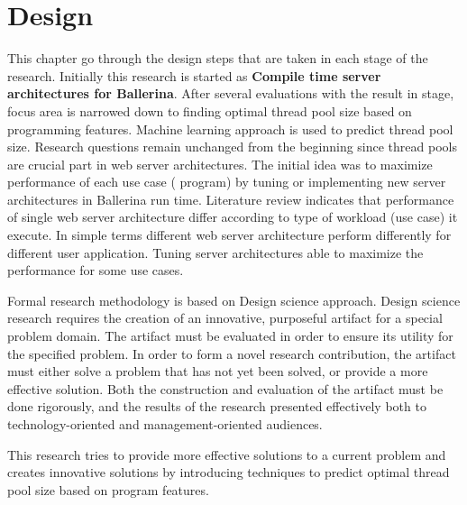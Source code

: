 \chapter{Design}


This chapter go through the design steps that are taken in each stage of the research. Initially this research is started as\textbf{ Compile time server architectures for Ballerina}. After several evaluations with the result in stage, focus area is narrowed down to finding optimal thread pool size based on programming features. Machine learning approach is used to predict thread pool size. Research questions remain unchanged from the beginning since thread pools are crucial part in web server architectures. The initial idea was to maximize performance of each use case ( program) by tuning or implementing new server architectures in Ballerina run time. Literature review indicates that performance of single web server architecture differ according to type of workload (use case) it execute. In simple terms different web server architecture perform differently for different user application. Tuning server architectures able to maximize the performance for some use cases.

Formal research methodology is based on Design science \cite{design_science} approach. Design science research requires the creation of an innovative, purposeful artifact for a special problem domain. The artifact must be evaluated in order to ensure its utility for the specified problem. In order to form a novel research contribution, the artifact must either solve a problem that has not yet been solved, or provide a more effective solution. Both the construction and evaluation of the artifact must be done rigorously, and the results of the research presented effectively both to technology-oriented and management-oriented audiences.

This research tries to provide more effective solutions to a current problem and creates innovative solutions by introducing techniques to predict optimal thread pool size based on program features.

%


